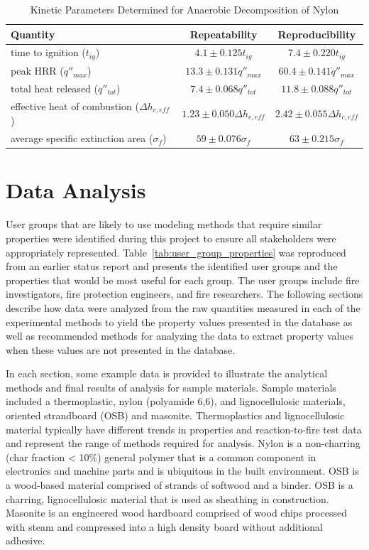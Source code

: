 \documentclass[12pt,oneside]{book}
\begin{document}
\begin{table}[!ht]{}
\centering
\caption[Kinetic Parameters Determined for Anaerobic Decomposition of Nylon]{Kinetic Parameters Determined for Anaerobic Decomposition of Nylon}
{\begin{tabular}{lcc}
\toprule
Quantity & Repeatability	& Reproducibility\\
\midrule
time to ignition ($t_{ig}$)			& $4.1 \pm 0.125t_{ig}$ 	& $7.4 \pm 0.220t_{ig}$	\\ 
peak HRR  ($\dot{q}''_{max}$)			& $13.3 \pm 0.131\dot{q}''_{max}$ 	& $60.4 \pm 0.141\dot{q}''_{max}$	\\ 
total heat released ($q''_{tot}$) 			& $7.4 \pm 0.068q''_{tot}$  	&	$11.8 \pm 0.088q''_{tot}$	\\ 
effective heat of combustion ($\Delta{h_{c,eff}}$) 			& $1.23 \pm 0.050\Delta{h_{c,eff}}$ 	&	$2.42 \pm 0.055\Delta{h_{c,eff}}$	\\ 
average specific extinction area ($\sigma_f$) 			& $59 \pm 0.076\sigma_f$	&	$63 \pm 0.215\sigma_f$	\\ 
\bottomrule
\end{tabular}}
\label{tab:cone_r_and_r}
\end{table}

\chapter{Data Analysis}
\label{sec:analysis}

User groups that are likely to use modeling methods that require similar properties were identified during this project to ensure all stakeholders were appropriately represented. Table~\ref{tab:user_group_properties} was reproduced from an earlier status report and presents the identified user groups and the properties that would be most useful for each group. The user groups include fire investigators, fire protection engineers, and fire researchers. The following sections describe how data were analyzed from the raw quantities measured in each of the experimental methods to yield the property values presented in the database as well as recommended methods for analyzing the data to extract property values when these values are not presented in the database. 

In each section, some example data is provided to illustrate the analytical methods and final results of analysis for sample materials. Sample materials included a thermoplastic, nylon (polyamide 6,6), and lignocellulosic materials, oriented strandboard (OSB) and masonite. Thermoplastics and lignocellulosic material typically have different trends in properties and reaction-to-fire test data and represent the range of methods required for analysis. Nylon is a non-charring (char fraction < 10\%) general polymer that is a common component in electronics and machine parts and is ubiquitous in the built environment. OSB is a wood-based material comprised of strands of softwood and a binder. OSB is a charring, lignocellulosic material that is used as sheathing in construction. Masonite is an engineered wood hardboard comprised of wood chips processed with steam and compressed into a high density board without additional adhesive.
\end{document}
